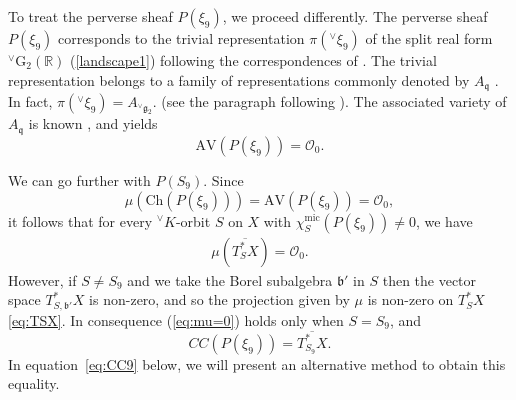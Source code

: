 \documentclass[a4paper, 11pt]{article}
\begin{document}
To treat the perverse sheaf \( P(\xi_9) \), we proceed differently.  
The perverse sheaf \( P(\xi_9) \) corresponds to the trivial representation  
\( \pi({^\vee}\xi_9) \) of the split real form \(
   {}^{\vee}\mathrm{G}_{2}(\mathbb{R}) \) (\ref{landscape1})
following the correspondences of \cite[Proposition 2.7]{ICIII}.    The
trivial representation belongs to a 
   family of representations commonly denoted by $A_{\mathfrak{q}}$
\cite[Section~2]{Vogan-Zuckerman}.  In fact, $\pi({}^{\vee}\xi_9) =
A_{{}^{\vee}\mathfrak{g}_2}.$ (see the paragraph 
following  \cite[Theorem~2.5]{Vogan-Zuckerman}).  The associated
variety of $A_{\mathfrak{q}}$ is known
\cite[Proposition~3.4]{Barbasch-Vogan-Trombi}, and yields 
\begin{equation}\label{eq:AVfor9}
\mathrm{AV}(P(\xi_9)) = \mathcal{O}_0.
\end{equation} 

We can go further with $P(S_{9})$.  Since
\[
\mu\left(\mathrm{Ch}(P(\xi_9))\right) = \mathrm{AV}(P(\xi_9)) = \mathcal{O}_0,
\]
it follows that for every ${}^{\vee}K$-orbit $S$ on $X$ with 
\( \chi_S^{\mathrm{mic}}(P(\xi_9)) \neq 0 \), we have
\begin{align}\label{eq:mu=0}
\mu(\overline{T_S^* X}) = \mathcal{O}_0.
\end{align}
However, if $S \neq S_{9}$ and we take the Borel subalgebra
$\mathfrak{b}'$ in $S$ then the vector space $T_{S,\mathfrak{b}'}^{*}X$ is 
non-zero, and so the projection given by $\mu$ is
non-zero on $T_{S}^{*}X$ \eqref{eq:TSX}.  In consequence
(\ref{eq:mu=0})  holds only when \( S =
S_9 \), and
\[
CC(P(\xi_9)) = \overline{T_{S_9}^{*}X}.
\]
In equation~\eqref{eq:CC9} below, we will present an alternative method to
obtain this equality. 
\end{document}
